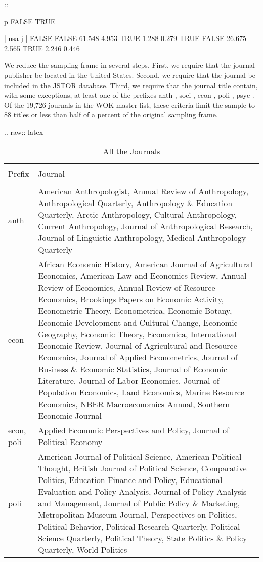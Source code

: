 ::

            p  FALSE   TRUE

| usa j
| FALSE FALSE 61.548 4.953 TRUE 1.288 0.279 TRUE FALSE 26.675 2.565 TRUE
  2.246 0.446

We reduce the sampling frame in several steps. First, we require that
the journal publisher be located in the United States. Second, we
require that the journal be included in the JSTOR database. Third, we
require that the journal title contain, with some exceptions, at least
one of the prefixes anth-, soci-, econ-, poli-, psyc-. Of the 19,726
journals in the WOK master list, these criteria limit the sample to 88
titles or less than half of a percent of the original sampling frame.

.. raw:: latex

   \begin{table}[!htbp] \centering 
     \caption{All the Journals} 
     \label{t-sframe} 
   \begin{tabular}{@{\extracolsep{5pt}} p{1in}p{4in}} 
   \\[-1.8ex]\hline 
   \hline \\[-1.8ex] 
   Prefix & Journal \\ 
   \hline \\[-1.8ex] 
   anth & American Anthropologist, Annual Review of Anthropology, Anthropological Quarterly, Anthropology \& Education Quarterly, Arctic Anthropology, Cultural Anthropology, Current Anthropology, Journal of Anthropological Research, Journal of Linguistic Anthropology, Medical Anthropology Quarterly \\ 
   econ & African Economic History, American Journal of Agricultural Economics, American Law and Economics Review, Annual Review of Economics, Annual Review of Resource Economics, Brookings Papers on Economic Activity, Econometric Theory, Econometrica, Economic Botany, Economic Development and Cultural Change, Economic Geography, Economic Theory, Economica, International Economic Review, Journal of Agricultural and Resource Economics, Journal of Applied Econometrics, Journal of Business \& Economic Statistics, Journal of Economic Literature, Journal of Labor Economics, Journal of Population Economics, Land Economics, Marine Resource Economics, NBER Macroeconomics Annual, Southern Economic Journal \\ 
   econ, poli & Applied Economic Perspectives and Policy, Journal of Political Economy \\ 
   poli & American Journal of Political Science, American Political Thought, British Journal of Political Science, Comparative Politics, Education Finance and Policy, Educational Evaluation and Policy Analysis, Journal of Policy Analysis and Management, Journal of Public Policy \& Marketing, Metropolitan Museum Journal, Perspectives on Politics, Political Behavior, Political Research Quarterly, Political Science Quarterly, Political Theory, State Politics \& Policy Quarterly, World Politics \\ 

\end{tabular}
\end{table}
